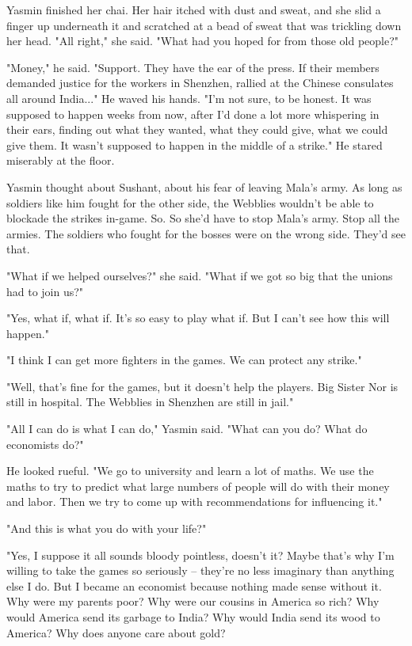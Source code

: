 Yasmin finished her chai. Her hair itched with dust and sweat, and
she slid a finger up underneath it and scratched at a bead of sweat
that was trickling down her head. "All right," she said. "What had
you hoped for from those old people?"

"Money," he said. "Support. They have the ear of the press. If
their members demanded justice for the workers in Shenzhen, rallied
at the Chinese consulates all around India..." He waved his hands.
"I'm not sure, to be honest. It was supposed to happen weeks from
now, after I'd done a lot more whispering in their ears, finding
out what they wanted, what they could give, what we could give
them. It wasn't supposed to happen in the middle of a strike." He
stared miserably at the floor.

Yasmin thought about Sushant, about his fear of leaving Mala's
army. As long as soldiers like him fought for the other side, the
Webblies wouldn't be able to blockade the strikes in-game. So. So
she'd have to stop Mala's army. Stop all the armies. The soldiers
who fought for the bosses were on the wrong side. They'd see that.

"What if we helped ourselves?" she said. "What if we got so big
that the unions had to join us?"

"Yes, what if, what if. It's so easy to play what if. But I can't
see how this will happen."

"I think I can get more fighters in the games. We can protect any
strike."

"Well, that's fine for the games, but it doesn't help the players.
Big Sister Nor is still in hospital. The Webblies in Shenzhen are
still in jail."

"All I can do is what I can do," Yasmin said. "What can you do?
What do economists do?"

He looked rueful. "We go to university and learn a lot of maths. We
use the maths to try to predict what large numbers of people will
do with their money and labor. Then we try to come up with
recommendations for influencing it."

"And this is what you do with your life?"

"Yes, I suppose it all sounds bloody pointless, doesn't it? Maybe
that's why I'm willing to take the games so seriously -- they're no
less imaginary than anything else I do. But I became an economist
because nothing made sense without it. Why were my parents poor?
Why were our cousins in America so rich? Why would America send its
garbage to India? Why would India send its wood to America? Why
does anyone care about gold?

